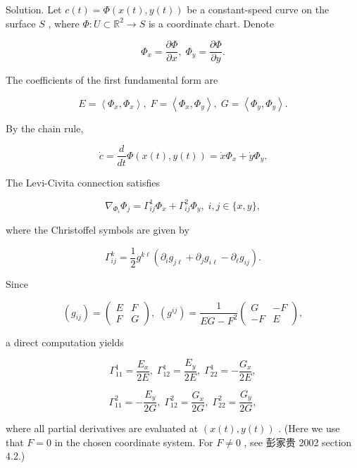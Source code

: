 \documentclass[10pt]{article}
\begin{document}
Solution. Let \(c\left( t\right)  = \Phi \left( {x\left( t\right) ,y\left( t\right) }\right)\) be a constant-speed curve on the surface \(S\) , where \(\Phi  : U \subset  {\mathbb{R}}^{2} \rightarrow  S\) is a coordinate chart. Denote

\[
{\Phi }_{x} = \frac{\partial \Phi }{\partial x},\;{\Phi }_{y} = \frac{\partial \Phi }{\partial y}.
\]

The coefficients of the first fundamental form are

\[
E = \left\langle  {{\Phi }_{x},{\Phi }_{x}}\right\rangle  ,\;F = \left\langle  {{\Phi }_{x},{\Phi }_{y}}\right\rangle  ,\;G = \left\langle  {{\Phi }_{y},{\Phi }_{y}}\right\rangle  .
\]

By the chain rule,

\[
\dot{c} = \frac{d}{dt}\Phi \left( {x\left( t\right) ,y\left( t\right) }\right)  = \dot{x}{\Phi }_{x} + \dot{y}{\Phi }_{y}.
\]

The Levi-Civita connection satisfies

\[
{\nabla }_{{\Phi }_{i}}{\Phi }_{j} = {\Gamma }_{ij}^{1}{\Phi }_{x} + {\Gamma }_{ij}^{2}{\Phi }_{y},\;i,j \in  \{ x,y\} ,
\]

where the Christoffel symbols are given by

\[
{\Gamma }_{ij}^{k} = \frac{1}{2}{g}^{k\ell }\left( {{\partial }_{i}{g}_{j\ell } + {\partial }_{j}{g}_{i\ell } - {\partial }_{\ell }{g}_{ij}}\right) .
\]

Since

\[
\left( {g}_{ij}\right)  = \left( \begin{array}{ll} E & F \\  F & G \end{array}\right) ,\;\left( {g}^{ij}\right)  = \frac{1}{{EG} - {F}^{2}}\left( \begin{matrix} G &  - F \\   - F & E \end{matrix}\right) ,
\]

a direct computation yields

\[
{\Gamma }_{11}^{1} = \frac{{E}_{x}}{2E},\;{\Gamma }_{12}^{1} = \frac{{E}_{y}}{2E},\;{\Gamma }_{22}^{1} =  - \frac{{G}_{x}}{2E},
\]

\[
{\Gamma }_{11}^{2} =  - \frac{{E}_{y}}{2G},\;{\Gamma }_{12}^{2} = \frac{{G}_{x}}{2G},\;{\Gamma }_{22}^{2} = \frac{{G}_{y}}{2G},
\]

where all partial derivatives are evaluated at \(\left( {x\left( t\right) ,y\left( t\right) }\right)\) . (Here we use that \(F = 0\) in the chosen coordinate system. For \(F \neq  0\) , see 彭家贵 2002 section 4.2.)
\end{document}
